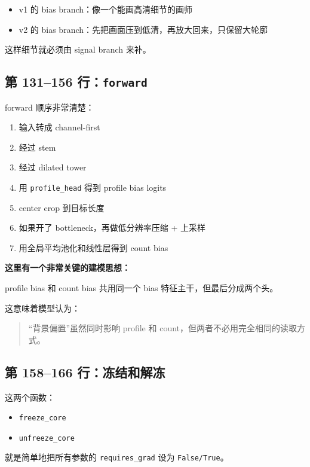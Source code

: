 \documentclass[11pt,a4paper]{ctexart}
\begin{document}
\begin{itemize}[leftmargin=2em]
\item v1 的 bias branch：像一个能画高清细节的画师
\item v2 的 bias branch：先把画面压到低清，再放大回来，只保留大轮廓
\end{itemize}

这样细节就必须由 signal branch 来补。

\subsection{第 131--156 行：\texttt{forward}}

forward 顺序非常清楚：

\begin{enumerate}[leftmargin=2em]
\item 输入转成 channel-first
\item 经过 stem
\item 经过 dilated tower
\item 用 \texttt{profile\_head} 得到 profile bias logits
\item center crop 到目标长度
\item 如果开了 bottleneck，再做低分辨率压缩 + 上采样
\item 用全局平均池化和线性层得到 count bias
\end{enumerate}

\textbf{这里有一个非常关键的建模思想：}

profile bias 和 count bias 共用同一个 bias 特征主干，但最后分成两个头。

这意味着模型认为：

\begin{quote}
“背景偏置”虽然同时影响 profile 和 count，但两者不必用完全相同的读取方式。
\end{quote}

\subsection{第 158--166 行：冻结和解冻}

这两个函数：

\begin{itemize}[leftmargin=2em]
\item \texttt{freeze\_core}
\item \texttt{unfreeze\_core}
\end{itemize}

就是简单地把所有参数的 \texttt{requires\_grad} 设为 \texttt{False/True}。
\end{document}
